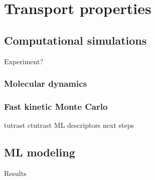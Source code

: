 \documentclass[thesis]{subfiles}
\begin{document}
\chapter{Transport properties}
\vspace*{-1\baselineskip}
\section{Computational simulations}
Experiment?
\subsection{Molecular dynamics}

\subsection{Fast kinetic Monte Carlo}
tutrast
ctutrast
ML descriptors
next steps

\section{ML modeling}

Results

\OnlyInSubfile{\printglobalbibliography}
\end{document}

